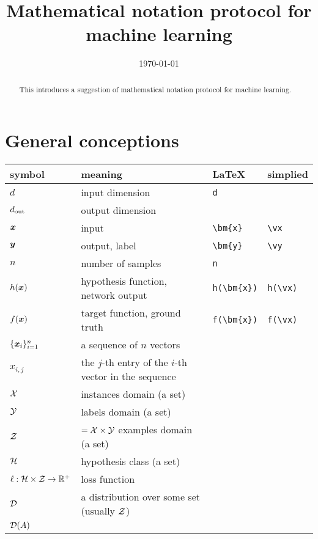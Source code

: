 \documentclass[]{report}
\begin{document}
\title{Mathematical notation protocol for machine learning}
\author{}
\date{\today}
\maketitle
\begin{abstract}
    This introduces a suggestion of mathematical notation protocol for machine learning.
\end{abstract}

\section{General conceptions}
\begin{center}
    \begin{tabular}{l|l|l|l} 
        \hline
        symbol & meaning & \LaTeX & simplied\\ 
        \hline
        $d$ & input dimension & \verb!d! &  \\
        $d_{\rm out}$ & output dimension & &  \\
        $\bm{x}$ & input & \verb!\bm{x}! & \verb!\vx! \\
        $\bm{y}$ & output, label & \verb!\bm{y}! & \verb!\vy! \\
        $n$ & number of samples & \verb!n!  \\
        $h(\bm{x})$ & hypothesis function, network output & \verb!h(\bm{x})! & \verb!h(\vx)! \\
        $f(\bm{x})$ & target function, ground truth & \verb!f(\bm{x})! & \verb!f(\vx)!  \\
        $\{\bm{x}_i\}_{i=1}^n$ 
        & a sequence of $n$ vectors\\
        $x_{i,j}$ 
        & the $j$-th entry of the $i$-th vector in the sequence\\
        $\mathcal{X}$ 
        & instances domain (a set)\\
        $\mathcal{Y}$ 
        & labels domain (a set)\\
        $\mathcal{Z}$ 
        & $=\mathcal{X}\times\mathcal{Y}$ examples domain (a set)\\
        $\mathcal{H}$ 
        & hypothesis class (a set)\\
        $\ell:\mathcal{H}\times \mathcal{Z}\to \mathbb{R}^+$ & loss function\\
        $\mathcal{D}$ 
        & a distribution over some set (usually $\mathcal{Z}$)\\
        $\mathcal{D}(A)$ 

\end{tabular}
\end{center}
\end{document}
